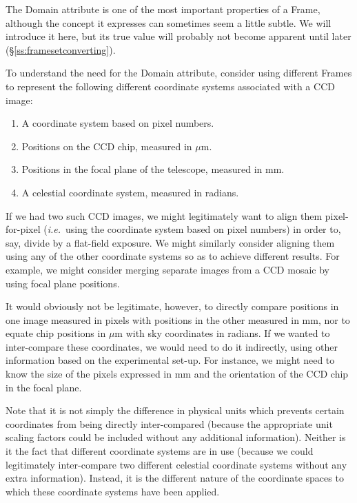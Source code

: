 \documentclass[twoside,11pt]{article}
\newcommand{\secref}[1]{\S\ref{#1}}
\newcommand{\secref}[1]{\ref{#1}}
\begin{document}
The Domain attribute is one of the most important properties of a
Frame, although the concept it expresses can sometimes seem a little
subtle.  We will introduce it here, but its true value will probably
not become apparent until later (\secref{ss:framesetconverting}).

To understand the need for the Domain attribute, consider using
different Frames to represent the following different coordinate
systems associated with a CCD image:

\begin{enumerate}
\item A coordinate system based on pixel numbers.

\item Positions on the CCD chip, measured in $\mu$m.

\item Positions in the focal plane of the telescope, measured in mm.

\item A celestial coordinate system, measured in radians.
\end{enumerate}

If we had two such CCD images, we might legitimately want to align
them pixel-for-pixel ({\em{i.e.}}\ using the coordinate system based
on pixel numbers) in order to, say, divide by a flat-field exposure.
We might similarly consider aligning them using any of the other
coordinate systems so as to achieve different results. For example, we
might consider merging separate images from a CCD mosaic by using
focal plane positions.

It would obviously not be legitimate, however, to directly compare
positions in one image measured in pixels with positions in the other
measured in mm, nor to equate chip positions in $\mu$m with sky
coordinates in radians. If we wanted to inter-compare these
coordinates, we would need to do it indirectly, using other
information based on the experimental set-up. For instance, we might
need to know the size of the pixels expressed in mm and the
orientation of the CCD chip in the focal plane.

Note that it is not simply the difference in physical units which
prevents certain coordinates from being directly inter-compared
(because the appropriate unit scaling factors could be included
without any additional information). Neither is it the fact that
different coordinate systems are in use (because we could legitimately
inter-compare two different celestial coordinate systems without any
extra information).  Instead, it is the different nature of the
coordinate spaces to which these coordinate systems have been applied.
\end{document}
